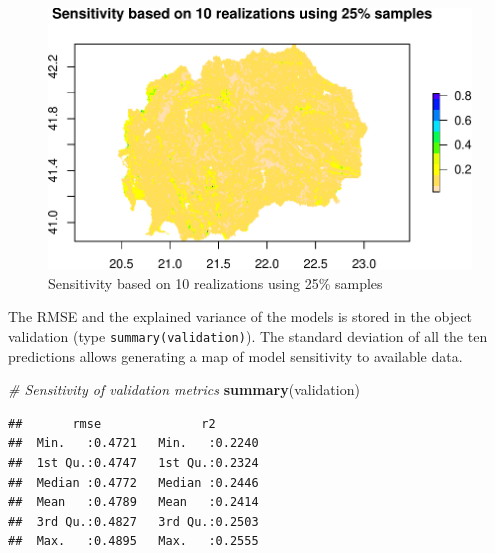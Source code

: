 \documentclass[10pt,b5paper,]{book}
\newenvironment{Shaded}{\begin{snugshade}}{\end{snugshade}}
\newcommand{\CommentTok}[1]{\textcolor[rgb]{0.56,0.35,0.01}{\textit{#1}}}
\newcommand{\DataTypeTok}[1]{\textcolor[rgb]{0.13,0.29,0.53}{#1}}
\newcommand{\DecValTok}[1]{\textcolor[rgb]{0.00,0.00,0.81}{#1}}
\newcommand{\KeywordTok}[1]{\textcolor[rgb]{0.13,0.29,0.53}{\textbf{#1}}}
\newcommand{\NormalTok}[1]{#1}
\newcommand{\OperatorTok}[1]{\textcolor[rgb]{0.81,0.36,0.00}{\textbf{#1}}}
\newcommand{\StringTok}[1]{\textcolor[rgb]{0.31,0.60,0.02}{#1}}
\theoremstyle{definition}
\theoremstyle{definition}
\theoremstyle{definition}
\theoremstyle{remark}
\begin{document}
\begin{Shaded}
\end{Shaded}

\begin{figure}
\centering
\includegraphics{SOCMapping_files/figure-latex/unnamed-chunk-62-1.pdf}
\caption{\label{fig:unnamed-chunk-62}Sensitivity based on 10 realizations
using 25\% samples}
\end{figure}

The RMSE and the explained variance of the models is stored in the
object validation (type \texttt{summary(validation)}). The standard
deviation of all the ten predictions allows generating a map of model
sensitivity to available data.

\begin{Shaded}
\begin{Highlighting}[]
\CommentTok{# Sensitivity of validation metrics}
\KeywordTok{summary}\NormalTok{(validation)}
\end{Highlighting}
\end{Shaded}

\begin{verbatim}
##       rmse              r2        
##  Min.   :0.4721   Min.   :0.2240  
##  1st Qu.:0.4747   1st Qu.:0.2324  
##  Median :0.4772   Median :0.2446  
##  Mean   :0.4789   Mean   :0.2414  
##  3rd Qu.:0.4827   3rd Qu.:0.2503  
##  Max.   :0.4895   Max.   :0.2555
\end{verbatim}
\end{document}
